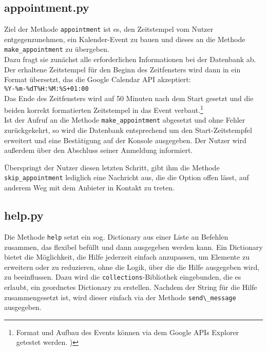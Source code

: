         \subsection{appointment.py} \label{appointment.py}
                Ziel der Methode \verb|appointment| ist es, den Zeitstempel vom Nutzer entgegenzunehmen, ein Kalender-Event zu bauen und dieses an die Methode \verb|make_appointment| zu übergeben. \\
                Dazu fragt sie zunächst alle erforderlichen Informationen bei der Datenbank ab. Der erhaltene Zeitstempel für den Beginn des Zeitfensters wird dann in ein Format übersetzt, das die Google Calendar API akzeptiert: \\ 
                \verb/%Y-%m-%dT%H:%M:%S+01:00/ \\
                Das Ende des Zeitfensters wird auf 50 Minuten nach dem Start gesetzt und die beiden korrekt formatierten Zeitstempel in das Event verbaut.\footnote{Format und Aufbau des Events können via dem Google APIs Explorer getestet werden. \cite{apiExplorer})} \\
                Ist der Aufruf an die Methode \verb|make_appointment| abgesetzt und ohne Fehler zurückgekehrt, so wird die Datenbank entsprechend um den Start-Zeitstempfel erweitert und eine Bestätigung auf der Konsole ausgegeben. Der Nutzer wird außerdem über den Abschluss seiner Anmeldung informiert. 

                Überspringt der Nutzer diesen letzten Schritt, gibt ihm die Methode \verb|skip_appointment| lediglich eine Nachricht aus, die die Option offen lässt, auf anderem Weg mit dem Anbieter in Kontakt zu treten.

        
        \subsection{help.py} \label{help.py}
                Die Methode \verb|help| setzt ein sog. Dictionary aus einer Liste an Befehlen zusammen, das flexibel befüllt und dann ausgegeben werden kann. Ein Dictionary bietet die Möglichkeit, die Hilfe jederzeit einfach anzupassen, um Elemente zu erweitern oder zu reduzieren, ohne die Logik, über die die Hilfe ausgegeben wird, zu beeinflussen. Dazu wird die \verb|collections|-Bibliothek eingebunden, die es erlaubt, ein geordnetes Dictionary zu erstellen. Nachdem der String für die Hilfe zusammengesetzt ist, wird dieser einfach via der Methode \verb|send\_message| ausgegeben.


